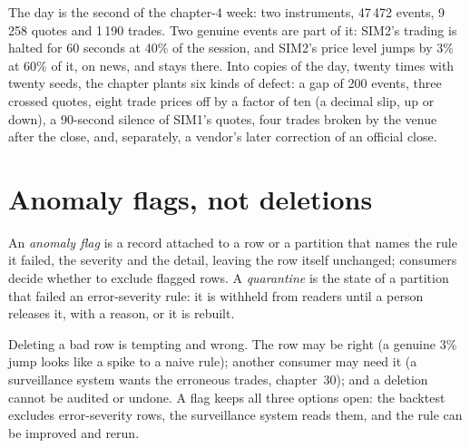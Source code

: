 \label{lst:pl:data-quality-and-lineage:rules}

The day is the second of the chapter-4 week: two instruments, 47\,472 events, 9\,258 quotes and 1\,190 trades. Two genuine events
are part of it: SIM2's trading is halted for 60 seconds at 40\% of the session, and SIM2's price level jumps by 3\% at 60\% of it,
on news, and stays there. Into copies of the day, twenty times with twenty seeds, the chapter plants six kinds of defect: a gap of
200 events, three crossed quotes, eight trade prices off by a factor of ten (a decimal slip, up or down), a 90-second silence of
SIM1's quotes, four trades broken by the venue after the close, and, separately, a vendor's later correction of an official close.

\section{Anomaly flags, not deletions}

\begin{definition}\label{def:pl:data-quality-and-lineage:flag}
An \emph{anomaly flag} is a record attached to a row or a partition that names the rule it failed, the
severity and the detail, leaving the row itself unchanged; consumers decide whether to exclude flagged rows. A
\emph{quarantine} is the state of a partition that failed an error-severity rule: it is withheld from readers
until a person releases it, with a reason, or it is rebuilt.
\end{definition}

Deleting a bad row is tempting and wrong. The row may be right (a genuine 3\% jump looks like a spike to a naive rule); another
consumer may need it (a surveillance system wants the erroneous trades, chapter~30); and a deletion cannot be audited or undone.
A flag keeps all three options open: the backtest excludes error-severity rows, the surveillance system reads them, and the rule
can be improved and rerun.


